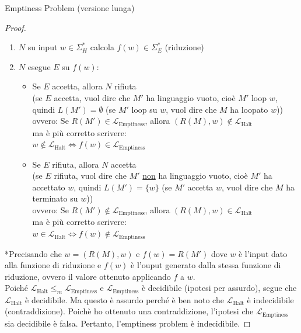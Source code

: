 \documentclass{article}  %
\theoremstyle{definition}
\begin{document}
\begin{theorem}{Emptiness Problem (versione lunga)}
\begin{proof}
    \begin{enumerate}
      \item $N$ su input $w \in \Sigma_H^*$ calcola $f(w) \in \Sigma_E^*$ (riduzione)
      \item $N$ esegue $E$ su $f(w)$:
      \begin{itemize}
        \item Se $E$ accetta, allora $N$ rifiuta \\
        (se $E$ accetta, vuol dire che $M'$ ha linguaggio vuoto, cioè $M'$ loop $w$, quindi $L(M')=\emptyset$ (se $M'$ loop su $w$, vuol
        dire che $M$ ha loopato $w$)) \\
        ovvero: Se $R(M') \in \mathcal{L}_{\text{Emptiness}}$, allora $(R(M),w) \notin \mathcal{L}_{\text{Halt}}$ \\
        ma è più corretto scrivere: \\
        $w \notin \mathcal{L}_{\text{Halt}} \iff  f(w) \in \mathcal{L}_{\text{Emptiness}}$
        \item Se $E$ rifiuta, allora $N$ accetta \\
        (se $E$ rifiuta, vuol dire che $M'$ \underline{non} ha linguaggio vuoto, cioè $M'$ ha accettato $w$, quindi $L(M')=\{w\}$ (se $M'$ accetta $w$, vuol
        dire che $M$ ha terminato su $w$)) \\ 
        ovvero: Se $R(M') \notin \mathcal{L}_{\text{Emptiness}}$, allora $(R(M),w) \in \mathcal{L}_{\text{Halt}}$ \\
        ma è più corretto scrivere: \\
        $w \in \mathcal{L}_{\text{Halt}} \iff f(w) \notin \mathcal{L}_{\text{Emptiness}}$
      \end{itemize} 
    \end{enumerate}
    *Precisando che $w=(R(M),w)$ e $f(w)=R(M')$
    dove $w$ è l'input dato alla funzione di riduzione e $f(w)$ è l'ouput generato dalla stessa funzione di riduzione, ovvero il valore ottenuto applicando $f$ a $w$. \\

    Poiché $\mathcal{L}_{\text{Halt}} \leq_m \mathcal{L}_{\text{Emptiness}}$ e $\mathcal{L}_{\text{Emptiness}}$ è decidibile (ipotesi per assurdo), segue 
    che $\mathcal{L}_{\text{Halt}}$ è decidibile.
    Ma questo è assurdo perché è ben noto che $\mathcal{L}_{\text{Halt}}$ è indecidibile (contraddizione). Poichè ho ottenuto una contraddizione, l'ipotesi che 
    $\mathcal{L}_{\text{Emptiness}}$ sia decidibile è falsa. Pertanto, l'emptiness problem è indecidibile.
  \end{proof}
\end{theorem}
\end{document}
